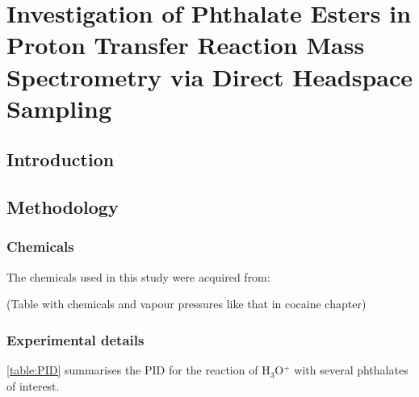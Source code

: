 \chapter{Investigation of Phthalate Esters in Proton Transfer Reaction Mass Spectrometry via Direct Headspace Sampling}













\section{Introduction}




\section{Methodology}

\subsection{Chemicals}
The chemicals used in this study were acquired from:


(Table with chemicals and vapour pressures like that in cocaine chapter)



\subsection{Experimental details}
\autoref{table:PID} summarises the PID for the reaction of H$_3$O$^+$ with several phthalates of interest.


